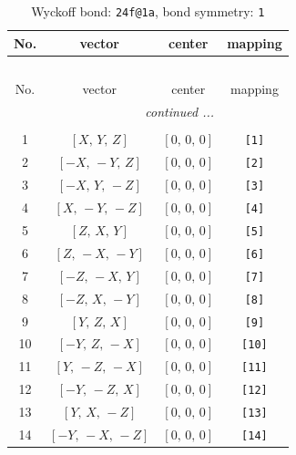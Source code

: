 \documentclass[fleqn,8pt]{jsarticle}
\begin{document}
\begin{longtable}{cccc}
\caption{Wyckoff bond: {\tt 24f@1a}, bond symmetry: {\tt 1}}
 \\
 \hline \hline
No. & vector & center & mapping \\ \hline \endfirsthead

\multicolumn{3}{l}{\tablename\ \thetable{}} \\
 \hline \hline
No. & vector & center & mapping \\ \hline \endhead

 \hline \hline
\multicolumn{3}{r}{\footnotesize\it continued ...} \\ \endfoot

 \hline \hline
\multicolumn{3}{r}{} \\ \endlastfoot

1 & $\left[ X,\, Y,\, Z \right]$ & $\left[ 0,\, 0,\, 0 \right]$ & {\tt [1]} \\ \hline
2 & $\left[ - X,\, - Y,\, Z \right]$ & $\left[ 0,\, 0,\, 0 \right]$ & {\tt [2]} \\ \hline
3 & $\left[ - X,\, Y,\, - Z \right]$ & $\left[ 0,\, 0,\, 0 \right]$ & {\tt [3]} \\ \hline
4 & $\left[ X,\, - Y,\, - Z \right]$ & $\left[ 0,\, 0,\, 0 \right]$ & {\tt [4]} \\ \hline
5 & $\left[ Z,\, X,\, Y \right]$ & $\left[ 0,\, 0,\, 0 \right]$ & {\tt [5]} \\ \hline
6 & $\left[ Z,\, - X,\, - Y \right]$ & $\left[ 0,\, 0,\, 0 \right]$ & {\tt [6]} \\ \hline
7 & $\left[ - Z,\, - X,\, Y \right]$ & $\left[ 0,\, 0,\, 0 \right]$ & {\tt [7]} \\ \hline
8 & $\left[ - Z,\, X,\, - Y \right]$ & $\left[ 0,\, 0,\, 0 \right]$ & {\tt [8]} \\ \hline
9 & $\left[ Y,\, Z,\, X \right]$ & $\left[ 0,\, 0,\, 0 \right]$ & {\tt [9]} \\ \hline
10 & $\left[ - Y,\, Z,\, - X \right]$ & $\left[ 0,\, 0,\, 0 \right]$ & {\tt [10]} \\ \hline
11 & $\left[ Y,\, - Z,\, - X \right]$ & $\left[ 0,\, 0,\, 0 \right]$ & {\tt [11]} \\ \hline
12 & $\left[ - Y,\, - Z,\, X \right]$ & $\left[ 0,\, 0,\, 0 \right]$ & {\tt [12]} \\ \hline
13 & $\left[ Y,\, X,\, - Z \right]$ & $\left[ 0,\, 0,\, 0 \right]$ & {\tt [13]} \\ \hline
14 & $\left[ - Y,\, - X,\, - Z \right]$ & $\left[ 0,\, 0,\, 0 \right]$ & {\tt [14]} \\ \hline

\end{longtable}
\end{document}
